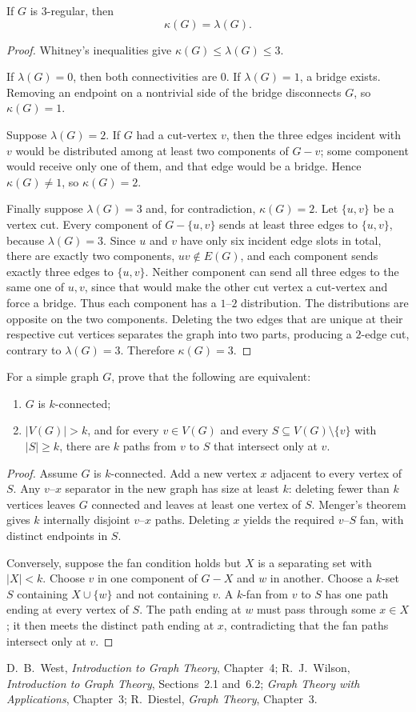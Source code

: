 \begin{notetheorem}
If $G$ is $3$-regular, then
\[
  \kappa(G)=\lambda(G).
\]
\end{notetheorem}
\begin{proof}
Whitney's inequalities give $\kappa(G)\le\lambda(G)\le3$.

If $\lambda(G)=0$, then both connectivities are $0$.  If $\lambda(G)=1$, a bridge exists.  Removing an endpoint on a nontrivial side of the bridge disconnects $G$, so $\kappa(G)=1$.

Suppose $\lambda(G)=2$.  If $G$ had a cut-vertex $v$, then the three edges incident with $v$ would be distributed among at least two components of $G-v$; some component would receive only one of them, and that edge would be a bridge.  Hence $\kappa(G)\ne1$, so $\kappa(G)=2$.

Finally suppose $\lambda(G)=3$ and, for contradiction, $\kappa(G)=2$.  Let $\{u,v\}$ be a vertex cut.  Every component of $G-\{u,v\}$ sends at least three edges to $\{u,v\}$, because $\lambda(G)=3$.  Since $u$ and $v$ have only six incident edge slots in total, there are exactly two components, $uv\notin E(G)$, and each component sends exactly three edges to $\{u,v\}$.  Neither component can send all three edges to the same one of $u,v$, since that would make the other cut vertex a cut-vertex and force a bridge.  Thus each component has a $1$--$2$ distribution.  The distributions are opposite on the two components.  Deleting the two edges that are unique at their respective cut vertices separates the graph into two parts, producing a $2$-edge cut, contrary to $\lambda(G)=3$.  Therefore $\kappa(G)=3$.
\end{proof}
\begin{noteexercise}
For a simple graph $G$, prove that the following are equivalent:
\begin{enumerate}
  \item $G$ is $k$-connected;
  \item $|V(G)|>k$, and for every $v\in V(G)$ and every $S\subseteq V(G)\setminus\{v\}$ with $|S|\ge k$, there are $k$ paths from $v$ to $S$ that intersect only at $v$.
\end{enumerate}
\end{noteexercise}
\begin{proof}
Assume $G$ is $k$-connected.  Add a new vertex $x$ adjacent to every vertex of $S$.  Any $v$--$x$ separator in the new graph has size at least $k$: deleting fewer than $k$ vertices leaves $G$ connected and leaves at least one vertex of $S$.  Menger's theorem gives $k$ internally disjoint $v$--$x$ paths.  Deleting $x$ yields the required $v$--$S$ fan, with distinct endpoints in $S$.

Conversely, suppose the fan condition holds but $X$ is a separating set with $|X|<k$.  Choose $v$ in one component of $G-X$ and $w$ in another.  Choose a $k$-set $S$ containing $X\cup\{w\}$ and not containing $v$.  A $k$-fan from $v$ to $S$ has one path ending at every vertex of $S$.  The path ending at $w$ must pass through some $x\in X$; it then meets the distinct path ending at $x$, contradicting that the fan paths intersect only at $v$.
\end{proof}
\begin{noteremark}
D.~B.~West, \emph{Introduction to Graph Theory}, Chapter~4; R.~J.~Wilson, \emph{Introduction to Graph Theory}, Sections~2.1 and~6.2; \emph{Graph Theory with Applications}, Chapter~3; R.~Diestel, \emph{Graph Theory}, Chapter~3.
\end{noteremark}

